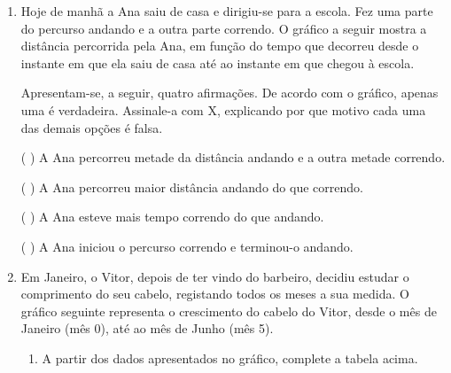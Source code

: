 \begin{enumerate}
\begin{enumerate}
\end{enumerate}

\item Hoje de manhã a Ana saiu de casa e dirigiu-se para a escola. Fez uma parte do percurso andando e a outra parte correndo. O gráfico a seguir mostra a distância percorrida pela Ana, em função do tempo que decorreu desde o instante em que ela saiu de casa até ao instante em que chegou à escola.
\begin{center}\end{center}
Apresentam-se, a seguir, quatro afirmações. De acordo com o gráfico, apenas uma é verdadeira. Assinale-a com X, explicando por que motivo cada uma das demais opções é falsa.

( { } ) A Ana percorreu metade da distância andando e a outra metade correndo.

( { } ) A Ana percorreu maior distância andando do que correndo.

( { } ) A Ana esteve mais tempo correndo do que andando.

( { } ) A Ana iniciou o percurso correndo e terminou-o andando.

\item Em Janeiro, o Vitor, depois de ter vindo do barbeiro, decidiu estudar o comprimento do seu cabelo, registando todos os meses a sua medida. O gráfico seguinte representa o crescimento do cabelo do Vitor, desde o mês de Janeiro (mês 0), até ao mês de Junho (mês 5).
\label{\detokenize{AF106-E1:fig-cabelo}}

\begin{center}
\end{center}\begin{enumerate}
\item {} 
A partir dos dados apresentados no gráfico, complete a tabela acima.


\end{enumerate}
\end{enumerate}
